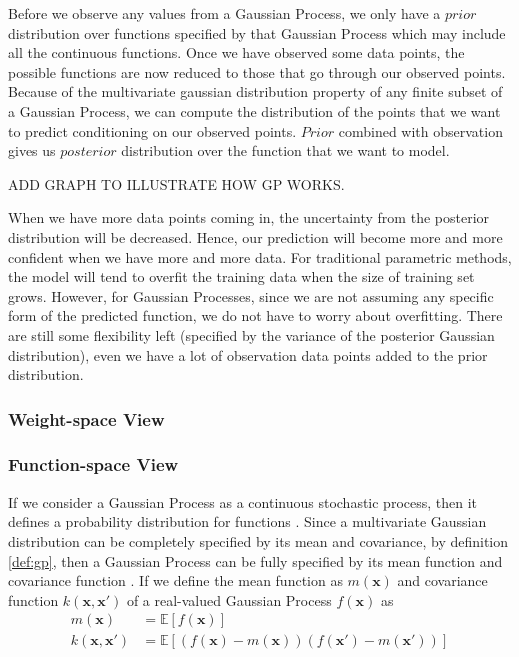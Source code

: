 \documentclass[12pt,a4paper]{article}
\theoremstyle{definition}
\newcommand{\EE}{\mathbb{E}}
\numberwithin{equation}{section}
\let\vec\mathbf
\begin{document}
Before we observe any values from a Gaussian Process, we only have a $prior$ distribution over functions specified by that Gaussian Process which may include all the continuous functions. Once we have observed some data points, the possible functions are now reduced to those that go through our observed points. Because of the multivariate gaussian distribution property of any finite subset of a Gaussian Process, we can compute the distribution of the points that we want to predict conditioning on our observed points. $Prior$ combined with observation gives us $posterior$ distribution over the function that we want to model.

ADD GRAPH TO ILLUSTRATE HOW GP WORKS.

When we have more data points coming in, the uncertainty from the posterior distribution will be decreased. Hence, our prediction will become more and more confident when we have more and more data. For traditional parametric methods, the model will tend to overfit the training data when the size of training set grows. However, for Gaussian Processes, since we are not assuming any specific form of the predicted function, we do not have to worry about overfitting. There are still some flexibility left (specified by the variance of the posterior Gaussian distribution), even we have a lot of observation data points added to the  prior distribution. 

\subsubsection{Weight-space View}

\subsubsection{Function-space View}
If we consider a Gaussian Process as a continuous stochastic process, then it defines a probability distribution for functions \cite[Papoulis]{Papoulis}. Since a multivariate Gaussian distribution can be completely specified by its mean and covariance, by definition \ref{def:gp}, then a Gaussian Process can be fully specified by its mean function and covariance function \cite[Rasmussen and Williams]{RandW}. If we define the mean function as $m(\vec{x})$ and covariance function $k(\vec{x},\vec{x'})$ of a real-valued Gaussian Process $f(\vec x)$ as
\begin{equation} \label{}
\begin{split}
m(\vec{x}) & = \EE \left[ f(\vec x)\right] \\
k(\vec{x},\vec{x'}) & = \EE \left[ \left( f(\vec x)-m(\vec{x})\right)\left( f(\vec x')-m(\vec{x'})\right)\right] 
\end{split}
\end{equation}
\end{document}
